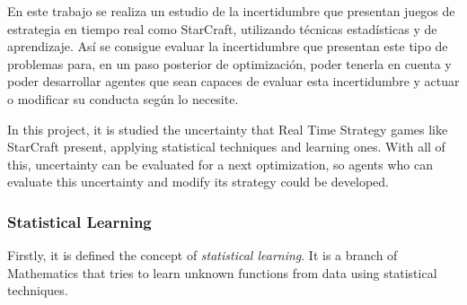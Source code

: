 En este trabajo se realiza un estudio de la incertidumbre que presentan juegos
de estrategia en tiempo real como StarCraft, utilizando técnicas estadísticas
y de aprendizaje. Así se consigue evaluar la incertidumbre
que presentan este tipo de problemas para, en un paso posterior de optimización,
poder tenerla en cuenta y poder desarrollar agentes que sean capaces de evaluar
esta incertidumbre y actuar o modificar su conducta según lo necesite.

\begin{otherlanguage}{british}
In this project, it is studied the uncertainty that Real Time Strategy games
like StarCraft present, applying statistical techniques and learning ones. With all of this,
uncertainty can be evaluated for a next optimization, so agents
who can evaluate this uncertainty and modify its strategy could be developed.

\subsubsection*{Statistical Learning}

Firstly, it is defined the concept of \emph{statistical learning}. It is a
branch of Mathematics that tries to learn unknown functions from data using
statistical techniques.

\end{otherlanguage}
